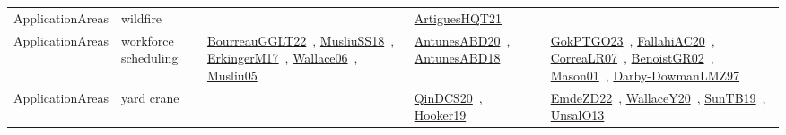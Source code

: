 {\begin{longtable}{lp{3cm}>{\raggedright\arraybackslash}p{6cm}>{\raggedright\arraybackslash}p{6cm}>{\raggedright\arraybackslash}p{8cm}}
\index{wildfire}\index{ApplicationAreas!wildfire}ApplicationAreas & wildfire &  & \href{../works/ArtiguesHQT21.pdf}{ArtiguesHQT21}~\cite{ArtiguesHQT21} & \\
\index{workforce scheduling}\index{ApplicationAreas!workforce scheduling}ApplicationAreas & workforce scheduling & \href{../works/BourreauGGLT22.pdf}{BourreauGGLT22}~\cite{BourreauGGLT22}, \href{../works/MusliuSS18.pdf}{MusliuSS18}~\cite{MusliuSS18}, \href{../works/ErkingerM17.pdf}{ErkingerM17}~\cite{ErkingerM17}, \href{../works/Wallace06.pdf}{Wallace06}~\cite{Wallace06}, \href{../works/Musliu05.pdf}{Musliu05}~\cite{Musliu05} & \href{../works/AntunesABD20.pdf}{AntunesABD20}~\cite{AntunesABD20}, \href{../works/AntunesABD18.pdf}{AntunesABD18}~\cite{AntunesABD18} & \href{../works/GokPTGO23.pdf}{GokPTGO23}~\cite{GokPTGO23}, \href{../works/FallahiAC20.pdf}{FallahiAC20}~\cite{FallahiAC20}, \href{../works/CorreaLR07.pdf}{CorreaLR07}~\cite{CorreaLR07}, \href{../works/BenoistGR02.pdf}{BenoistGR02}~\cite{BenoistGR02}, \href{../works/Mason01.pdf}{Mason01}~\cite{Mason01}, \href{../works/Darby-DowmanLMZ97.pdf}{Darby-DowmanLMZ97}~\cite{Darby-DowmanLMZ97}\\
\index{yard crane}\index{ApplicationAreas!yard crane}ApplicationAreas & yard crane &  & \href{../works/QinDCS20.pdf}{QinDCS20}~\cite{QinDCS20}, \href{../works/Hooker19.pdf}{Hooker19}~\cite{Hooker19} & \href{../works/EmdeZD22.pdf}{EmdeZD22}~\cite{EmdeZD22}, \href{../works/WallaceY20.pdf}{WallaceY20}~\cite{WallaceY20}, \href{../works/SunTB19.pdf}{SunTB19}~\cite{SunTB19}, \href{../works/UnsalO13.pdf}{UnsalO13}~\cite{UnsalO13}\\
\end{longtable}
}

